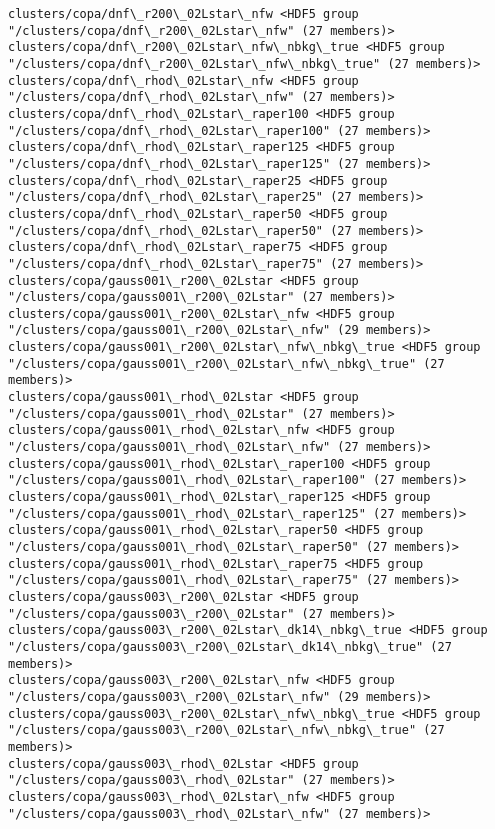 \documentclass[11pt]{article}
\begin{document}
\begin{Verbatim}[commandchars=\\\{\}]
clusters/copa/dnf\_r200\_02Lstar\_nfw <HDF5 group "/clusters/copa/dnf\_r200\_02Lstar\_nfw" (27 members)>
clusters/copa/dnf\_r200\_02Lstar\_nfw\_nbkg\_true <HDF5 group "/clusters/copa/dnf\_r200\_02Lstar\_nfw\_nbkg\_true" (27 members)>
clusters/copa/dnf\_rhod\_02Lstar\_nfw <HDF5 group "/clusters/copa/dnf\_rhod\_02Lstar\_nfw" (27 members)>
clusters/copa/dnf\_rhod\_02Lstar\_raper100 <HDF5 group "/clusters/copa/dnf\_rhod\_02Lstar\_raper100" (27 members)>
clusters/copa/dnf\_rhod\_02Lstar\_raper125 <HDF5 group "/clusters/copa/dnf\_rhod\_02Lstar\_raper125" (27 members)>
clusters/copa/dnf\_rhod\_02Lstar\_raper25 <HDF5 group "/clusters/copa/dnf\_rhod\_02Lstar\_raper25" (27 members)>
clusters/copa/dnf\_rhod\_02Lstar\_raper50 <HDF5 group "/clusters/copa/dnf\_rhod\_02Lstar\_raper50" (27 members)>
clusters/copa/dnf\_rhod\_02Lstar\_raper75 <HDF5 group "/clusters/copa/dnf\_rhod\_02Lstar\_raper75" (27 members)>
clusters/copa/gauss001\_r200\_02Lstar <HDF5 group "/clusters/copa/gauss001\_r200\_02Lstar" (27 members)>
clusters/copa/gauss001\_r200\_02Lstar\_nfw <HDF5 group "/clusters/copa/gauss001\_r200\_02Lstar\_nfw" (29 members)>
clusters/copa/gauss001\_r200\_02Lstar\_nfw\_nbkg\_true <HDF5 group "/clusters/copa/gauss001\_r200\_02Lstar\_nfw\_nbkg\_true" (27 members)>
clusters/copa/gauss001\_rhod\_02Lstar <HDF5 group "/clusters/copa/gauss001\_rhod\_02Lstar" (27 members)>
clusters/copa/gauss001\_rhod\_02Lstar\_nfw <HDF5 group "/clusters/copa/gauss001\_rhod\_02Lstar\_nfw" (27 members)>
clusters/copa/gauss001\_rhod\_02Lstar\_raper100 <HDF5 group "/clusters/copa/gauss001\_rhod\_02Lstar\_raper100" (27 members)>
clusters/copa/gauss001\_rhod\_02Lstar\_raper125 <HDF5 group "/clusters/copa/gauss001\_rhod\_02Lstar\_raper125" (27 members)>
clusters/copa/gauss001\_rhod\_02Lstar\_raper50 <HDF5 group "/clusters/copa/gauss001\_rhod\_02Lstar\_raper50" (27 members)>
clusters/copa/gauss001\_rhod\_02Lstar\_raper75 <HDF5 group "/clusters/copa/gauss001\_rhod\_02Lstar\_raper75" (27 members)>
clusters/copa/gauss003\_r200\_02Lstar <HDF5 group "/clusters/copa/gauss003\_r200\_02Lstar" (27 members)>
clusters/copa/gauss003\_r200\_02Lstar\_dk14\_nbkg\_true <HDF5 group "/clusters/copa/gauss003\_r200\_02Lstar\_dk14\_nbkg\_true" (27 members)>
clusters/copa/gauss003\_r200\_02Lstar\_nfw <HDF5 group "/clusters/copa/gauss003\_r200\_02Lstar\_nfw" (29 members)>
clusters/copa/gauss003\_r200\_02Lstar\_nfw\_nbkg\_true <HDF5 group "/clusters/copa/gauss003\_r200\_02Lstar\_nfw\_nbkg\_true" (27 members)>
clusters/copa/gauss003\_rhod\_02Lstar <HDF5 group "/clusters/copa/gauss003\_rhod\_02Lstar" (27 members)>
clusters/copa/gauss003\_rhod\_02Lstar\_nfw <HDF5 group "/clusters/copa/gauss003\_rhod\_02Lstar\_nfw" (27 members)>

\end{Verbatim}
\end{document}
